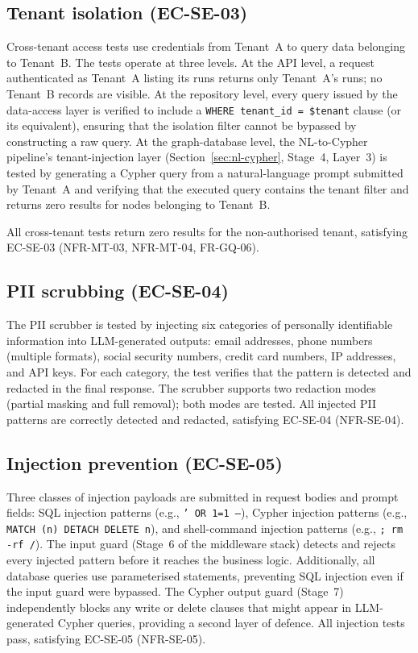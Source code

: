 \documentclass[a4paper,noexaminfo]{sapthesis}
\begin{document}
\subsection{Tenant isolation (EC-SE-03)}

Cross-tenant access tests use credentials from Tenant~A to query data
belonging to Tenant~B.  The tests operate at three levels.  At the API
level, a request authenticated as Tenant~A listing its runs returns only
Tenant~A's runs; no Tenant~B records are visible.  At the repository
level, every query issued by the data-access layer is verified to
include a \texttt{WHERE tenant\_id = \$tenant} clause (or its
equivalent), ensuring that the isolation filter cannot be bypassed by
constructing a raw query.  At the graph-database level, the NL-to-Cypher
pipeline's tenant-injection layer (Section~\ref{sec:nl-cypher}, Stage~4,
Layer~3) is tested by generating a Cypher query from a natural-language
prompt submitted by Tenant~A and verifying that the executed query
contains the tenant filter and returns zero results for nodes belonging
to Tenant~B.

All cross-tenant tests return zero results for the non-authorised tenant,
satisfying EC-SE-03 (NFR-MT-03, NFR-MT-04, FR-GQ-06).

\subsection{PII scrubbing (EC-SE-04)}

The PII scrubber is tested by injecting six categories of personally
identifiable information into LLM-generated outputs: email addresses,
phone numbers (multiple formats), social security numbers, credit card
numbers, IP addresses, and API keys.  For each category, the test
verifies that the pattern is detected and redacted in the final response.
The scrubber supports two redaction modes (partial masking and full
removal); both modes are tested.  All injected PII patterns are
correctly detected and redacted, satisfying EC-SE-04 (NFR-SE-04).

\subsection{Injection prevention (EC-SE-05)}

Three classes of injection payloads are submitted in request bodies and
prompt fields: SQL injection patterns (e.g., \texttt{' OR 1=1 --}),
Cypher injection patterns (e.g., \texttt{MATCH (n) DETACH DELETE n}),
and shell-command injection patterns (e.g., \texttt{; rm -rf /}).  The
input guard (Stage~6 of the middleware stack) detects and rejects every
injected pattern before it reaches the business logic.  Additionally, all
database queries use parameterised statements, preventing SQL injection
even if the input guard were bypassed.  The Cypher output guard
(Stage~7) independently blocks any write or delete clauses that might
appear in LLM-generated Cypher queries, providing a second layer of
defence.  All injection tests pass, satisfying EC-SE-05 (NFR-SE-05).
\end{document}
